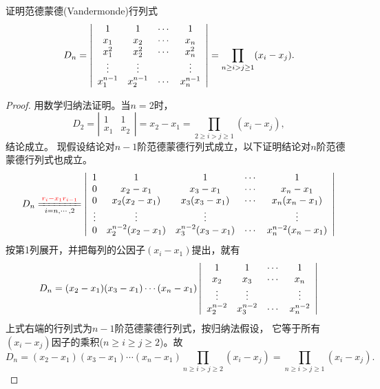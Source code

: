 \begin{li}
  证明范德蒙德(Vandermonde)行列式
  $$
  D_n = \left|
    \begin{array}{cccc}
      1        &  1        & \cdots &    1     \\                    
      x_1      &  x_2      & \cdots &    x_n    \\ 
      x_1^2    &  x_2^2     & \cdots &   x_n^2   \\ 
      \vdots      &  \vdots      &     &    \vdots      \\
      x_1^{n-1} & x_2^{n-1} &  \cdots &  x_n^{n-1}
    \end{array}
  \right|
  = \prod_{n \ge i > j \ge 1}(x_i-x_j).
  $$
\end{li}
\begin{proof}
  用数学归纳法证明。当$n=2$时，
  $$
  D_2 = \left|
    \begin{array}{cc}
      1 & 1 \\
      x_1 & x_2
    \end{array}
  \right|
  = x_2 - x_1 = \prod_{2 \ge i > j \ge 1} (x_i - x_j),
  $$
  结论成立。
  现假设结论对$n-1$阶范德蒙德行列式成立，以下证明结论对$n$阶范德蒙德行列式也成立。 
  $$
  D_n \xlongequal[i=n,\cdots, 2]{\red{r_i - x_1 r_{i-1}}}\left|
    \begin{array}{ccccc}  
      1     & 1                    & 1                       & \cd   & 1    \\
      0     & x_2 - x_1            & x_3 - x_1               &  \cd  & x_n - x_1 \\
      0     & x_2(x_2 - x_1)       & x_3(x_3 - x_1)          &  \cd  & x_n(x_n - x_1)\\
      \vd   & \vd                  & \vd                     &      & \vd   \\
      0     & x_2^{n-2}(x_2-x_1)    & x_3^{n-2}(x_3 - x_1)    &  \cd  & x_n^{n-2}(x_n - x_1) 
    \end{array}\right|
  $$  
  按第1列展开，并把每列的公因子$(x_i-x_1)$提出，就有
  $$
  D_n = (x_2-x_1)(x_3-x_1)\cdots(x_n-x_1)\left|
    \begin{array}{cccc}  
      1            & 1          &  \cdots  & 1 \\
      x_2          & x_3         &  \cdots  & x_n\\
      \vdots          & \vdots         &      & \vdots   \\
      x_2^{n-2}     & x_3^{n-2}    &  \cdots  & x_n^{n-2}
    \end{array}\right|
  $$
  上式右端的行列式为$n-1$阶范德蒙德行列式，按归纳法假设，
  它等于所有$(x_i-x_j)$因子的乘积($n\ge i \ge j \ge 2$)。故
  $$
  D_n = (x_2-x_1)(x_3-x_1)\cdots(x_n-x_1) \prod_{n\ge i > j \ge 2}(x_i - x_j)
  = \prod_{n\ge i > j \ge 1}(x_i - x_j).
  $$
\end{proof}


